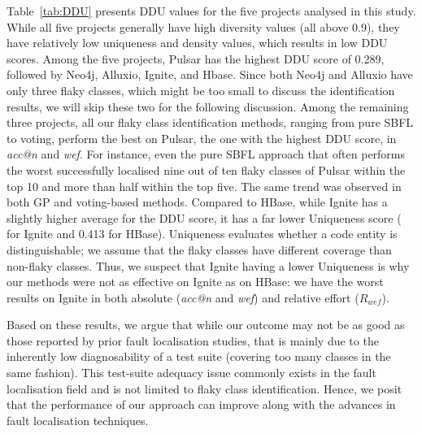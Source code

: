 Table~\ref{tab:DDU} presents DDU values for the five projects analysed in this study. While all five projects generally have high diversity values (\ie all above 0.9), they have relatively low uniqueness and density values, which results in low DDU scores. Among the five projects, Pulsar has the highest DDU score of 0.289, followed by Neo4j, Alluxio, Ignite, and Hbase. Since both Neo4j and Alluxio have only three flaky classes, which might be too small to discuss the identification results, we will skip these two for the following discussion.
Among the remaining three projects, all our flaky class identification methods, ranging from pure SBFL to voting, perform the best on Pulsar, the one with the highest DDU score, in \textit{acc@n} and \textit{wef}. For instance, even the pure SBFL approach that often performs the worst successfully localised nine out of ten flaky classes of Pulsar within the top 10 and more than half within the top five. The same trend was observed in both GP and voting-based methods.
Compared to HBase, while Ignite has a slightly higher average for the DDU score, it has a far lower Uniqueness score ( for Ignite and 0.413 for HBase). Uniqueness evaluates whether a code entity is distinguishable; we assume that the flaky classes have different coverage than non-flaky classes. Thus, we suspect that Ignite having a lower Uniqueness is why our methods were not as effective on Ignite as on HBase: we have the worst results on Ignite in both absolute (\ie \textit{acc@n} and \textit{wef}) and relative effort (\ie $R_{wef}$). 

Based on these results, we argue that while our outcome may not be as good as those reported by prior fault localisation studies\cite{Yoo:2017ss,sohn-TSE}, that is mainly due to the inherently low diagnosability of a test suite (\eg covering too many classes in the same fashion). This test-suite adequacy issue commonly exists in the fault localisation field\cite{sohn2021assisting} and is not limited to flaky class identification. Hence, we posit that the performance of our approach can improve along with the advances in fault localisation techniques. 


